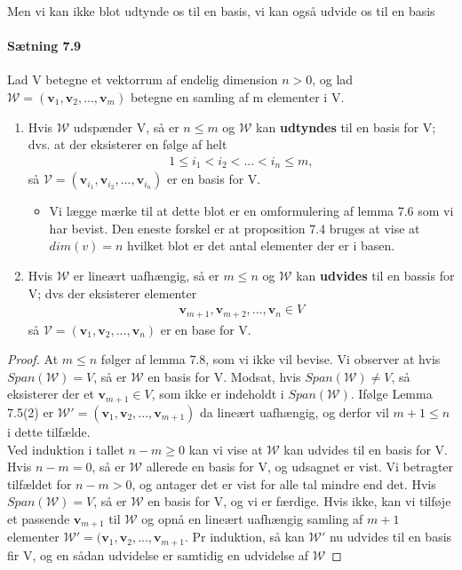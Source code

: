 \documentclass[paper=a4, fontsize=11pt]{scrartcl} %
\begin{document}
	Men vi kan ikke blot udtynde os til en basis, vi kan også udvide os til en basis
	
	\paragraph{Sætning 7.9} Lad V betegne et vektorrum af endelig dimension $n>0$, og lad $\mathcal{W}=(\mathbf{v}_1,\mathbf{v}_2,...,\mathbf{v}_m)$ betegne en samling af m elementer i V.
	\begin{enumerate}
		\item Hvis $\mathcal{W}$ udspænder V, så er $n\leq m$ og $\mathcal{W}$ kan \textbf{udtyndes} til en basis for V; dvs. at der eksisterer en følge af helt
		\begin{align*}
		1\leq i_1 < i_2 <...<i_n \leq m,
		\end{align*}
		så $\mathcal{V}=(\mathbf{v}_{i_1},\mathbf{v}_{i_2},...,\mathbf{v}_{i_n})$ er en basis for V.
		\begin{itemize}
			\item Vi lægge mærke til at dette blot er en omformulering af lemma 7.6 som vi har bevist. Den eneste forskel er at proposition 7.4 bruges at vise at $dim(v)=n$ hvilket blot er det antal elementer der er i basen.
		\end{itemize}
		\item Hvis $\mathcal{W}$ er lineært uafhængig, så er $m\leq n$ og $\mathcal{W}$ kan \textbf{udvides} til en bassis for V; dvs der eksisterer elementer 
		\begin{align*}
		\mathbf{v}_{m+1},\mathbf{v}_{m+2},...,\mathbf{v}_{n}\in V
		\end{align*}
		så $\mathcal{V}=(\mathbf{v}_{1},\mathbf{v}_{2},...,\mathbf{v}_{n})$ er en base for V.
	\end{enumerate}
	
	\begin{proof}
		At $m\leq n$ følger af lemma 7.8, som vi ikke vil bevise. Vi observer at hvis $Span(\mathcal{W})=V$, så er $\mathcal{W}$ en basis for V. Modsat, hvis $Span(\mathcal{W})\neq V$, så eksisterer der et $\mathbf{v}_{m+1}\in V$, som ikke er indeholdt i $Span(\mathcal{W})$. Ifølge Lemma 7.5(2) er $\mathcal{W}'=(\mathbf{v}_1,\mathbf{v}_2,...,\mathbf{v}_{m+1})$ da lineært uafhængig, og derfor vil $m+1\leq n$ i dette tilfælde. \\
		
		Ved induktion i tallet $n-m\geq0$ kan vi vise at $\mathcal{W}$ kan udvides til en basis for V. Hvis $n-m=0$, så er $\mathcal{W}$ allerede en basis for V, og udsagnet er vist. Vi betragter tilfældet for $n-m>0$, og antager det er vist for alle tal mindre end det. Hvis $Span(\mathcal{W})=V$, så er $\mathcal{W}$ en basis for V, og vi er færdige. Hvis ikke, kan vi tilføje et passende $\mathbf{v}_{m+1}$ til $\mathcal{W}$ og opnå en lineært uafhængig samling af $m+1$ elementer $\mathcal{W}'=(\mathbf{v}_1,\mathbf{v}_2,...,\mathbf{v}_{m+1}$. Pr induktion, så kan $\mathcal{W}'$ nu udvides til en basis fir V, og en sådan udvidelse er samtidig en udvidelse af $\mathcal{W}$
	\end{proof}
	
\end{document}
